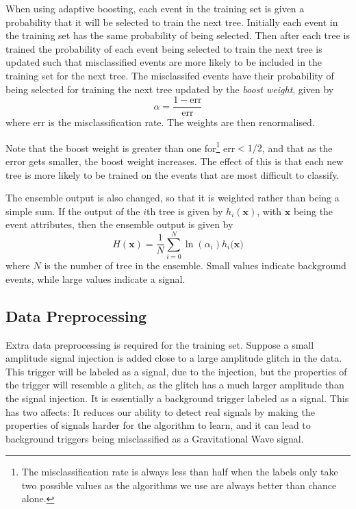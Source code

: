 \documentclass[11pt]{cuthesis}
\begin{document}
When using adaptive boosting, each event in the training set is given a probability that it will be selected to train the next tree. Initially each event in the training set has the same probability of being selected. Then after each tree is trained the probability of each event being selected to train the next tree is updated such that misclassified events are more likely to be included in the training set for the next tree. The misclassifed events have their probability of being selected for training the next tree updated by the \textit{boost weight}, given by
\begin{equation}
\alpha = \frac{1 - \text{err}}{\text{err}} 
\end{equation}
where err is the misclassification rate. The weights are then renormalised. 

Note that the boost weight is greater than one for\footnote{The misclassification rate is always less than half when the labels only take two possible values as the algorithms we use are always better than chance alone.} err$< 1/2$, and that as the error gets smaller, the boost weight increases. The effect of this is that each new tree is more likely to be trained on the events that are most difficult to classify. 

The ensemble output is also changed, so that it is weighted rather than being a simple sum. If the output of the $i$th tree is given by $h_i(\textbf{x})$, with $\textbf{x}$ being the event attributes, then the ensemble output is given by
\begin{equation}
H(\textbf{x}) = \frac{1}{N}\sum_{i=0}^N \ln(\alpha_i)h_i(\textbf{x)}
\end{equation}  
where $N$ is the number of tree in the ensemble. Small values indicate background events, while large values indicate a signal. 

\subsection{Data Preprocessing}\label{data-preprocessing}
Extra data preprocessing is required for the training set. Suppose a small amplitude signal injection is added close to a large amplitude glitch in the data. This trigger will be labeled as a signal, due to the injection, but the properties of the trigger will resemble a glitch, as the glitch has a much larger amplitude than the signal injection. It is essentially a background trigger labeled as a signal. This has two affects: It reduces our ability to detect real signals by making the properties of signals harder for the algorithm to learn, and it can lead to background triggers being misclassified as a Gravitational Wave signal.  
\end{document}
